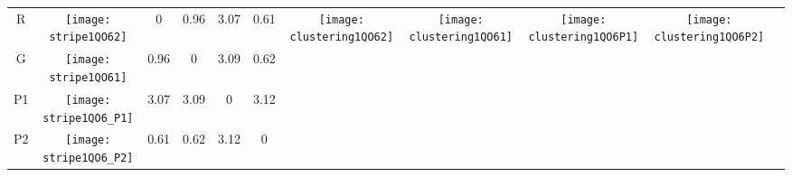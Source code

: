 \documentclass[a4paper,11pt,twoside]{book}%
\begin{document}
\begin{appendices}
\begin{sidewaystable}[h!]
\begin{tabular*}{4cm}{cc|c|c|c|c|c|c|c|c|c|}
\cline{1-10}
\multicolumn{1}{|c|}{R} & \texttt{[image: stripe1QO62]} & 0 & 0.96 & 3.07 & 0.61 & \multirow{4}{*}{\vspace{-0.3cm}\texttt{[image: clustering1QO62]}} & \multirow{4}{*}{\vspace{-0.3cm}\texttt{[image: clustering1QO61]}} & \multirow{4}{*}{\vspace{-0.3cm}\texttt{[image: clustering1QO6P1]}} & \multirow{4}{*}{\vspace{-0.3cm}\texttt{[image: clustering1QO6P2]}} &  \multirow{5}{*}{} \\
\cline{1-6}
\multicolumn{1}{|c|}{G} & \texttt{[image: stripe1QO61]} & 0.96 & 0 & 3.09 & 0.62 & \multirow{4}{*}{} & \multirow{4}{*}{} & \multirow{4}{*}{} & \multirow{4}{*}{} & \multirow{5}{*}{} \\
\cline{1-6}
\multicolumn{1}{|c|}{P1} & \texttt{[image: stripe1QO6\_P1]} & 3.07 & 3.09 & 0 & 3.12 & \multirow{4}{*}{} & \multirow{4}{*}{} & \multirow{4}{*}{} & \multirow{4}{*}{} & \multirow{5}{*}{}  \\
\cline{1-6}
\multicolumn{1}{|c|}{P2} & \texttt{[image: stripe1QO6\_P2]} & 0.61 & 0.62 & 3.12 & 0 & \multirow{4}{*}{} & \multirow{4}{*}{} & \multirow{4}{*}{} & \multirow{4}{*}{} & \multirow{5}{*}{}  \\
\cline{1-11}
\end{tabular*}
\normalfont
\end{sidewaystable}


\end{appendices}
\end{document}

